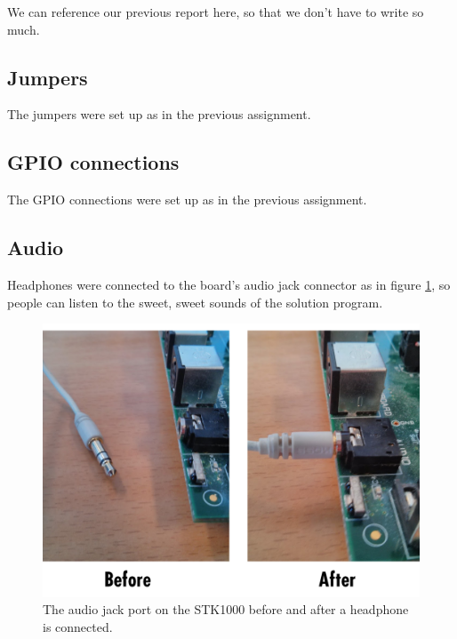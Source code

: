 We can reference our previous report here, so that we don't have to write so much.

\subsection{Jumpers}

The jumpers were set up as in the previous assignment.\cite{tdt4258-1}

\subsection{GPIO connections}

The GPIO connections were set up as in the previous assignment.\cite{tdt4258-1}

\subsection{Audio}

Headphones were connected to the board's audio jack connector as in figure \ref{img-audiojack}, so people can listen to the sweet, sweet sounds of the solution program.

\begin{figure}[h]
\includegraphics[width = \textwidth]{images/audiojack.png}
\caption{The audio jack port on the STK1000 before and after a headphone is connected.}
\label{img-audiojack}
\end{figure}

\newpage
